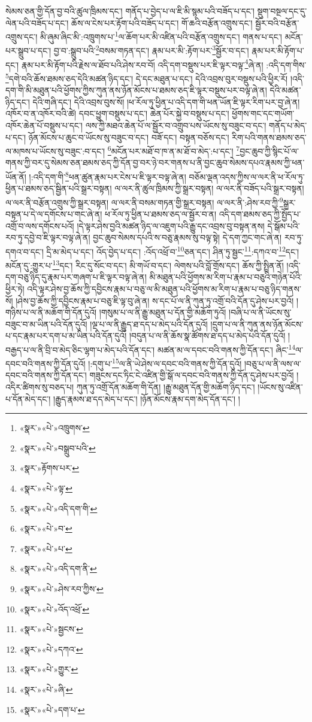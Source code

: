 སེམས་ཅན་གྱི་དོན་བྱ་བའི་ཚུལ་ཁྲིམས་དང་། གནོད་པ་བྱེད་པ་ལ་ཇི་མི་སྙམ་པའི་བཟོད་པ་དང་། སྡུག་བསྔལ་དང་དུ་ལེན་པའི་བཟོད་པ་དང་། ཆོས་ལ་ངེས་པར་རྟོག་པའི་བཟོད་པ་དང་། གོ་ཆའི་བརྩོན་འགྲུས་དང་། སྦྱོར་བའི་བརྩོན་འགྲུས་དང་། མི་ཞུམ་ཞིང་མི་:འཁྲུགས་པ་\footnote{«སྣར་»«པེ་»འཁྲུགས་}ལ་ཆོག་པར་མི་འཛིན་པའི་བརྩོན་འགྲུས་དང་། གནས་པ་དང་། མངོན་པར་སྒྲུབ་པ་དང་། བྱ་བ་:སྒྲུབ་པའི་\footnote{«སྣར་»«པེ་»བསྒྲུབ་པའི་}བསམ་གཏན་དང་། རྣམ་པར་མི་:རྟོག་པར་\footnote{«སྣར་»རྟོགས་པར་}སྦྱོར་བ་དང་། རྣམ་པར་མི་རྟོག་པ་དང་། རྣམ་པར་མི་རྟོག་པའི་རྗེས་ལ་ཐོབ་པའི་ཤེས་རབ་བོ། འདི་དག་བསྡུས་པར་ཇི་ལྟར་བལྟ་\footnote{«སྣར་»«པེ་»ལྟ་}ཞེ་ན། :འདི་དག་གིས་\footnote{«སྣར་»«པེ་»འདི་དག་གི་}དགེ་བའི་ཆོས་ཐམས་ཅད་དེའི་མཚན་ཉིད་དང་། དེ་དང་མཐུན་པ་དང་། དེའི་འབྲས་བུར་བསྡུས་པའི་ཕྱིར་རོ། །འདི་དག་གི་མི་མཐུན་པའི་ཕྱོགས་ཀྱིས་ཀུན་ནས་ཉོན་མོངས་པ་ཐམས་ཅད་ཇི་ལྟར་བསྡུས་པར་བལྟ་ཞེ་ན། དེའི་མཚན་ཉིད་དང་། དེའི་གཞི་དང་། དེའི་འབྲས་བུས་སོ། །ཕ་རོལ་ཏུ་ཕྱིན་པ་འདི་དག་གི་ཕན་ཡོན་ཇི་ལྟར་རིག་པར་བྱ་ཞེ་ན། འཁོར་བ་ན་འཁོར་བའི་ཚེ། དབང་ཕྱུག་བསྡུས་པ་དང་། ཆེན་པོར་སྐྱེ་བ་བསྡུས་པ་དང་། ཕྱོགས་གང་དང་གཡོག་འཁོར་ཆེན་པོ་བསྡུས་པ་དང་། ལས་ཀྱི་མཐའ་ཆེན་པོ་ལ་སྦྱོར་བ་འགྲུབ་པས་ཡོངས་སུ་བཟུང་བ་དང་། གནོད་པ་མེད་པ་དང་། ཉོན་མོངས་པ་ཆུང་བ་ཡོངས་སུ་བཟུང་བ་དང་། བཟོ་དང་། བསྟན་བཅོས་དང་། རིག་པའི་གནས་ཐམས་ཅད་ལ་མཁས་པ་ཡོངས་སུ་བཟུང་:བ་དང་། \footnote{«སྣར་»«པེ་»བ་}མངོན་པར་མཐོ་བ་ཁ་ན་མ་ཐོ་བ་མེད་:པ་དང་། \footnote{«སྣར་»«པེ་»པ་}བྱང་ཆུབ་ཀྱི་སྙིང་པོ་ལ་གནས་ཀྱི་བར་དུ་སེམས་ཅན་ཐམས་ཅད་ཀྱི་དོན་བྱ་བར་ཉེ་བར་གནས་པ་ནི་བྱང་ཆུབ་སེམས་དཔའ་རྣམས་ཀྱི་ཕན་ཡོན་ནོ། །:འདི་དག་གི་\footnote{«སྣར་»«པེ་»འདི་དག་ནི་}ཕན་ཚུན་རྣམ་པར་ངེས་པ་ཇི་ལྟར་བལྟ་ཞེ་ན། བཅོམ་ལྡན་འདས་ཀྱིས་ལ་ལར་ནི་ཕ་རོལ་ཏུ་ཕྱིན་པ་ཐམས་ཅད་སྦྱིན་པའི་སྒྲར་བསྟན། ལ་ལར་ནི་ཚུལ་ཁྲིམས་ཀྱི་སྒྲར་བསྟན། ལ་ལར་ནི་བཟོད་པའི་སྒྲར་བསྟན། ལ་ལར་ནི་བརྩོན་འགྲུས་ཀྱི་སྒྲར་བསྟན། ལ་ལར་ནི་བསམ་གཏན་གྱི་སྒྲར་བསྟན། ལ་ལར་ནི་:ཤེས་རབ་ཀྱི་\footnote{«སྣར་»«པེ་»ཤེས་རབ་ཀྱིས་}སྒྲར་བསྟན་པ་དེ་ལ་དགོངས་པ་གང་ཞེ་ན། ཕ་རོལ་ཏུ་ཕྱིན་པ་ཐམས་ཅད་ལ་སྦྱོར་བ་ན། འདི་དག་ཐམས་ཅད་ཀྱི་སྤྱོད་པ་འགྲོ་བ་ལས་དགོངས་པའོ། །དེ་ལྟར་ཤེས་བྱའི་མཚན་ཉིད་ལ་འཇུག་པའི་རྒྱུ་དང་འབྲས་བུ་བསྟན་ནས། དེ་སྒོམ་པའི་རབ་ཏུ་དབྱེ་བ་ཇི་ལྟར་བལྟ་ཞེ་ན། བྱང་ཆུབ་སེམས་དཔའི་ས་བཅུ་རྣམས་སུ་བལྟ་སྟེ། དེ་དག་ཀྱང་གང་ཞེ་ན། རབ་ཏུ་དགའ་བ་དང་། དྲི་མ་མེད་པ་དང་། འོད་བྱེད་པ་དང་། :འོད་འཕྲོ་བ་\footnote{«སྣར་»«པེ་»འོད་འཕྲོ་}ཅན་དང་། ཤིན་ཏུ་སྦྱང་\footnote{«སྣར་»«པེ་»སྦྱངས་}:དཀའ་བ་\footnote{«སྣར་»«པེ་»དཀའ་}དང་། མངོན་དུ་:གྱུར་པ་\footnote{«སྣར་»«པེ་»གྱུར་}དང་། རིང་དུ་སོང་བ་དང་། མི་གཡོ་བ་དང་། ལེགས་པའི་བློ་གྲོས་དང་། ཆོས་ཀྱི་སྤྲིན་ནོ། །འདི་དག་བཅུ་ཉིད་དུ་རྣམ་པར་གཞག་པ་ཇི་ལྟར་བལྟ་ཞེ་ན། མི་མཐུན་པའི་ཕྱོགས་མ་རིག་པ་རྣམ་པ་བཅུའི་གཉེན་པོའི་ཕྱིར་ཏེ། འདི་ལྟར་ཤེས་བྱ་ཆོས་ཀྱི་དབྱིངས་རྣམ་པ་བཅུ་ལ་མི་མཐུན་པའི་ཕྱོགས་མ་རིག་པ་རྣམ་པ་བཅུ་ཉིད་གནས་སོ། །ཤེས་བྱ་ཆོས་ཀྱི་དབྱིངས་རྣམ་པ་བཅུ་ཇི་ལྟ་བུ་ཞེ་ན། ས་དང་པོ་ལ་ནི་ཀུན་ཏུ་འགྲོ་བའི་དོན་དུ་ཤེས་པར་བྱའོ། །གཉིས་པ་ལ་ནི་མཆོག་གི་དོན་དུའོ། །གསུམ་པ་ལ་ནི་རྒྱུ་མཐུན་པ་དོན་གྱི་མཆོག་ཏུའོ། །བཞི་པ་ལ་ནི་ཡོངས་སུ་བཟུང་བ་མ་ཡིན་པའི་དོན་དུའོ། །ལྔ་པ་ལ་ནི་རྒྱུད་ཐ་དད་པ་མེད་པའི་དོན་དུའོ། །དྲུག་པ་ལ་ནི་ཀུན་ནས་ཉོན་མོངས་པ་དང་རྣམ་པར་དག་པ་མ་ཡིན་པའི་དོན་དུའོ། །བདུན་པ་ལ་ནི་ཆོས་སྣ་ཚོགས་ཐ་དད་པ་མེད་པའི་དོན་དུའོ། །བརྒྱད་པ་ལ་ནི་བྲི་བ་མེད་ཅིང་ལྷག་པ་མེད་པའི་དོན་དང་། མཚན་མ་ལ་དབང་བའི་གནས་ཀྱི་དོན་དང་། ཞིང་\footnote{«སྣར་»«པེ་»ཞི་}ལ་དབང་བའི་གནས་ཀྱི་དོན་དུའོ། །:དགུ་པ་\footnote{«སྣར་»«པེ་»དག་པ་}ལ་ནི་ཡེ་ཤེས་ལ་དབང་བའི་གནས་ཀྱི་དོན་དུའོ། །བཅུ་པ་ལ་ནི་ལས་ལ་དབང་བའི་གནས་ཀྱི་དོན་དང་། གཟུངས་དང་ཏིང་ངེ་འཛིན་གྱི་སྒོ་ལ་དབང་བའི་གནས་ཀྱི་དོན་དུ་ཤེས་པར་བྱའོ། །འདིར་ཚིགས་སུ་བཅད་པ། ཀུན་ཏུ་འགྲོ་དོན་མཆོག་གི་དོན། །རྒྱུ་མཐུན་དོན་གྱི་མཆོག་ཉིད་དང་། །ཡོངས་སུ་འཛིན་པ་དོན་མེད་དང་། །རྒྱུད་རྣམས་ཐ་དད་མེད་པ་དང་། །ཉོན་མོངས་རྣམ་དག་མེད་དོན་དང་། །
